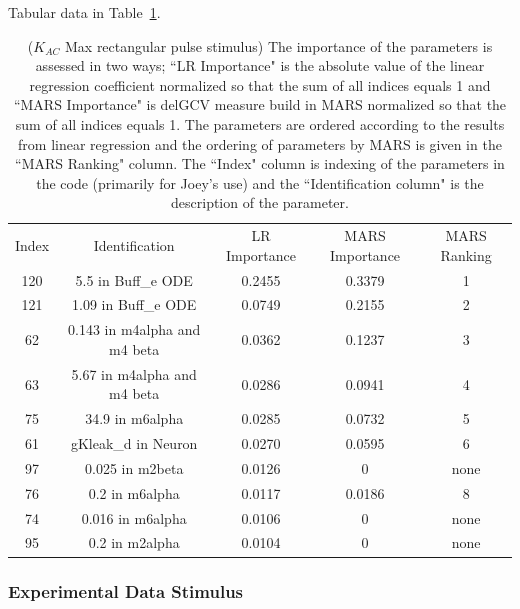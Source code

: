 \documentclass[12pt]{article}
\numberwithin{equation}{section}
\begin{document}
Tabular data in Table~\ref{qoi_K_AC_Max_rec}.

\begin{table}[h]
\centering
\begin{tabular}{ccccc}
Index & Identification & LR Importance & MARS Importance & MARS Ranking \\
120 & 5.5 in Buff\_e ODE & 0.2455 & 0.3379 & 1\\
121 & 1.09 in Buff\_e ODE & 0.0749 & 0.2155 & 2\\
62 & 0.143 in m4alpha and m4 beta &  0.0362 & 0.1237 & 3\\
63 &   5.67 in m4alpha and m4 beta & 0.0286 & 0.0941 & 4\\
75 & 34.9 in m6alpha & 0.0285 & 0.0732 & 5\\
61 & gKleak\_d in Neuron & 0.0270 & 0.0595 & 6\\
97 & 0.025 in m2beta & 0.0126 & 0 & none\\
76 & 0.2 in m6alpha & 0.0117 &  0.0186 & 8\\
74 & 0.016 in m6alpha & 0.0106 & 0 & none\\
95 & 0.2 in m2alpha & 0.0104 & 0 & none\\
\end{tabular}
\caption{ ($K_{AC}$ Max rectangular pulse stimulus) The importance of the parameters is assessed in two ways; ``LR Importance" is the absolute value of the linear regression coefficient normalized so that the sum of all indices equals 1 and ``MARS Importance" is delGCV measure build in MARS normalized so that the sum of all indices equals 1. The parameters are ordered according to the results from linear regression and the ordering of parameters by MARS is given in the ``MARS Ranking" column. The ``Index" column is indexing of the parameters in the code (primarily for Joey's use) and the ``Identification column" is the description of the parameter.}
\label{qoi_K_AC_Max_rec}
\end{table}

\newpage

\subsubsection{Experimental Data Stimulus}
\end{document}
